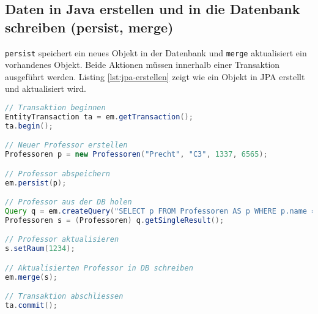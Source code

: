 \subsection{Daten in Java erstellen und in die Datenbank schreiben (persist, merge)}

\texttt{persist} speichert ein neues Objekt in der Datenbank und \texttt{merge} aktualisiert ein vorhandenes Objekt. Beide Aktionen müssen innerhalb einer Transaktion ausgeführt werden. Listing \ref{lst:jpa-erstellen} zeigt wie ein Objekt in JPA erstellt und aktualisiert wird.

\begin{lstlisting}[language=Java,keywordstyle=\color{keywordcolor},caption={Daten updaten mit JPA},label=lst:jpa-erstellen]
// Transaktion beginnen
EntityTransaction ta = em.getTransaction();
ta.begin();

// Neuer Professor erstellen
Professoren p = new Professoren("Precht", "C3", 1337, 6565);

// Professor abspeichern
em.persist(p);

// Professor aus der DB holen
Query q = em.createQuery("SELECT p FROM Professoren AS p WHERE p.name = 'Precht'", Professoren.class);
Professoren s = (Professoren) q.getSingleResult();

// Professor aktualisieren
s.setRaum(1234);

// Aktualisierten Professor in DB schreiben
em.merge(s);

// Transaktion abschliessen
ta.commit();
\end{lstlisting}